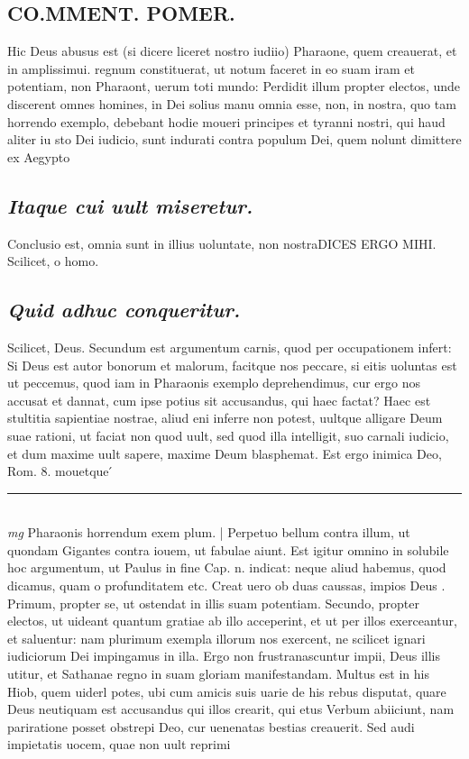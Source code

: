 \documentclass{article}
\begin{document}
\begin{pages}
\section*{CO.MMENT. POMER.  }\pstart Hic Deus abusus est (si dicere liceret nostro iudiio) Pharaone, quem creauerat, et in amplissimui. regnum constituerat, ut notum faceret in eo suam iram et potentiam, non Pharaont, uerum toti mundo: Perdidit illum propter electos, unde discerent omnes homines, in Dei solius manu omnia esse, non, in nostra, quo tam horrendo exemplo, debebant hodie moueri principes et tyranni nostri, qui haud aliter iu sto Dei iudicio, sunt indurati contra populum Dei, quem nolunt dimittere ex Aegypto\pend
{}
{}
\subsection*{\textit{Itaque cui uult miseretur. }}\pstart Conclusio est, omnia sunt in illius uoluntate, non nostraDICES ERGO MIHI. Scilicet, o homo.  \pend
{}
{}
\subsection*{\textit{Quid adhuc conqueritur. }}\pstart Scilicet, Deus. Secundum est argumentum carnis, quod per occupationem infert: Si Deus est autor bonorum et malorum, facitque nos peccare, si eitis uoluntas est ut peccemus, quod iam in Pharaonis exemplo deprehendimus, cur ergo nos accusat et dannat, cum ipse potius sit accusandus, qui haec factat? Haec est stultitia sapientiae nostrae, aliud eni inferre non potest, uultque alligare Deum suae rationi, ut faciat non quod uult, sed quod illa intelligit, suo carnali iudicio, et dum maxime uult sapere, maxime Deum blasphemat. Est ergo inimica Deo, Rom. 8. mouetque ́  \pend
\vspace{0.5cm}\noindent
\vspace{0.2cm}\rule{1cm}{0.2pt}\\ 
\hspace{0.2cm}\textit{mg}
\footnotesize Pharaonis horrendum exem plum.  
\normalsize| 
\marginpar{[ p.113 ]}\pstart Perpetuo bellum contra illum, ut quondam Gigantes contra iouem, ut fabulae aiunt. Est igitur omnino in solubile hoc argumentum, ut Paulus in fine Cap. n.  indicat: neque aliud habemus, quod dicamus, quam o profunditatem etc. Creat uero ob duas caussas, impios Deus . Primum, propter se, ut ostendat in illis suam potentiam. Secundo, propter electos, ut uideant quantum gratiae ab illo acceperint, et ut per illos exerceantur, et saluentur: nam plurimum exempla illorum nos exercent, ne scilicet ignari iudiciorum Dei impingamus in illa. Ergo non frustranascuntur impii, Deus illis utitur, et Sathanae regno in suam gloriam manifestandam. Multus est in his Hiob, quem uiderl potes, ubi cum amicis suis uarie de his rebus disputat, quare Deus neutiquam est accusandus qui illos crearit, qui etus Verbum abiiciunt, nam pariratione posset obstrepi Deo, cur uenenatas bestias creauerit. Sed audi impietatis uocem, quae non uult reprimi\pend
{}
{}

\end{pages}
\end{document}
